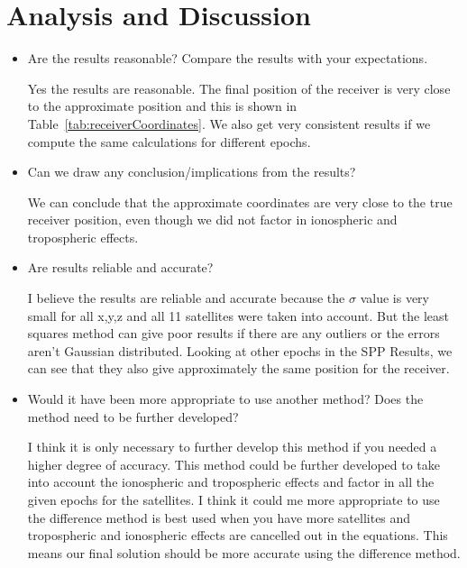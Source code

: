 \section{Analysis and Discussion} %
\label{sec:analysis_and_discussion}
\begin{itemize}
	\item Are the results reasonable? Compare the results with your expectations.
	
	Yes the results are reasonable.  The final position of the receiver is very close to the approximate position and this is shown in Table~\ref{tab:receiverCoordinates}.  We also get very consistent results if we compute the same calculations for different epochs.
	\item Can we draw any conclusion/implications from the results?  
	
	We can conclude that the approximate coordinates are very close to the true receiver position, even though we did not factor in ionospheric and tropospheric effects.  
	\item Are results reliable and accurate?
	
	I believe the results are reliable and accurate because the $\sigma$ value is very small for all x,y,z and all 11 satellites were taken into account.  But the least squares method can give poor results if there are any outliers or the errors aren't Gaussian distributed.\cite{Garcia:1999:NMP:554354}  Looking at other epochs in the SPP Results, we can see that they also give approximately the same position for the receiver.
	\item Would it have been more appropriate to use another method? Does the method need to be further developed?
	
	I think it is only necessary to further develop this method if you needed a higher degree of accuracy.  This method could be further developed to take into account the ionospheric and tropospheric effects and factor in all the given epochs for the satellites.  I think it could me more appropriate to use the difference method is best used when you have more satellites and tropospheric and ionospheric effects are cancelled out in the equations.  This means our final solution should be more accurate using the difference method.
\end{itemize}

